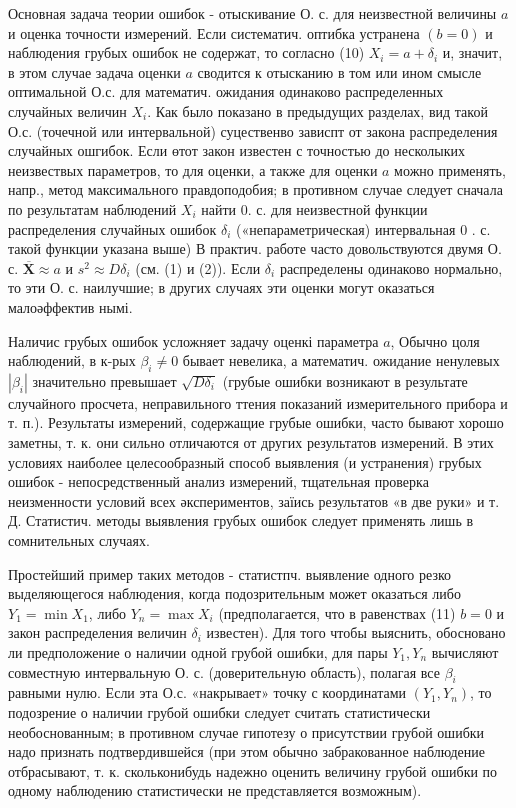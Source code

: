 \documentclass[10pt]{article}
\begin{document}
Основная задача теории ошибок - отыскивание О. с. для неизвестной величины $a$ и оценка точности измерений. Если систематич. оптибка устранена $(b=0)$ и наблюдения грубых ошибок не содержат, то согласно (10) $X_{i}=a+\delta_{i}$ и, значит, в этом случае задача оценки $a$ сводится к отысканию в том или ином смысле оптимальной О.с. для математич. ожидания одинаково распределенных случайных величин $X_{i}$. Как было показано в предыдущих разделах, вид такой О.с. (точечной или интервальной) суцественво зависпт от закона распределения случайных ошгибок. Если өтот закон известен с точностью до несколыких неизвествых параметров, то для оценки, а также для оценки $a$ можно применять, напр., метод максимального правдоподобия; в противном случае следует сначала по результатам наблюдений $X_{i}$ найти 0. с. для неизвестной функции распределения случайных ошибок $\delta_{i}$ («непараметрическая) интервальная 0 . с. такой функции указана выше) В практич. работе часто довольствуются двумя О. с. $\overline{\boldsymbol{X}} \approx a$ и $s^{2} \approx D \delta_{i}$ (см. (1) и (2)). Если $\delta_{i}$ распределены одинаково нормально, то эти О. с. наилучшие; в других случаях эти оценки могут оказаться малоәффектив нымі.



Наличис грубых ошибок усложняет задачу оценкі параметра $a$, Обычно цоля наблюдений, в к-рых $\beta_{i} \neq 0$ бывает невелика, а математич. ожидание ненулевых $\left|\beta_{i}\right|$ значительно превышает $\sqrt{D \delta_{i}}$ (грубые ошибки возникают в результате случайного просчета, неправильного ттения показаний измерительного прибора и т. п.). Результаты измерений, содержащие грубые ошибки, часто бывают хорошо заметны, т. к. они сильно отличаются от других результатов измерений. В этих условиях наиболее целесообразный способ выявления (и устранения) грубых ошибок - непосредственный анализ измерений, тщательная проверка неизменности условий всех әкспериментов, заїись результатов «в две руки» и т. Д. Статистич. методы выявления грубых ошибок следует применять лишь в сомнительных случаях.



Простейший пример таких методов - статистпч. выявление одного резко выделяющегося наблюдения, когда подозрительным может оказаться либо $Y_{1}=\min X_{1}$, либо $Y_{n}=\max X_{i}$ (предполагается, что в равенствах (11) $b=0$ и закон распределения величин $\delta_{i}$ известен). Для того чтобы выяснить, обосновано ли предположение о наличии одной грубой ошибки, для пары $Y_{1}, Y_{n}$ вычисляют совместную интервальную О. с. (доверительную область), полагая все $\beta_{i}$ равными нулю. Если эта О.с. «накрывает» точку с координатами $\left(Y_{1}, Y_{n}\right)$, то подозрение о наличии грубой ошибки следует считать статистически необоснованным; в противном случае гипотезу о присутствии грубой ошибки надо признать подтвердившейся (при этом обычно забракованное наблюдение отбрасывают, т. к. скольконибудь надежно оценить величину грубой ошибки по одному наблюдению статистически не представляется возможным).
\end{document}
